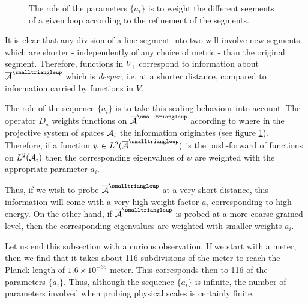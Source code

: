 \documentclass[12pt]{article}
\def\ca{{\cal A}}
\def\ck{{\cal K}}
\begin{document}


\begin{figure} [t]
\begin{center}
 
\caption{The role of the parameters $\{a_i \}$ is to weight the different segments of a given loop according to the refinement of the segments.}
\label{Fig...}
\end{center}
\end{figure}
 It is clear that any division of a line segment into two will involve new segments which are shorter - independently of any choice of metric - than the original segment. Therefore, functions in $V_\perp$ correspond to information about $\overline{\ca}^{\smalltriangleup}$ which is {\it deeper}, i.e. at a shorter distance, compared to information carried by functions in $V$.  

The role of the sequence $\{a_i\}$ is to take this scaling behaviour into account. The operator $D_{\smalltriangleup}$ weights functions on $\overline{\ca}^{\smalltriangleup}$ according to where in the projective system of spaces $\ca_{i}$ the information originates (see figure \ref{Fig...}). Therefore, if a function $\psi\in L^2(\overline{\ca}^{\smalltriangleup})$ is the push-forward of functions on $L^2(\ca_{i})$ then the corresponding eigenvalues of $\psi$ are weighted with the appropriate parameter $a_i$.

Thus, if we wish to probe $\overline{\ca}^{\smalltriangleup}$ at a very short distance, this information will come with a very high weight factor $a_i$ corresponding to high energy. On the other hand, if $\overline{\ca}^{\smalltriangleup}$ is probed at a more coarse-grained level, then the corresponding eigenvalues are weighted with smaller weights $a_i$.



Let us end this subsection with a curious observation. If we start with a meter, then we find that it takes about 116 subdivisions of the meter to reach the Planck length of
$
1.6 \times 10^{-35}
$ meter. This corresponds then to 116 of the parameters $\{a_i\}$. Thus, although the sequence $\{a_i\}$ is infinite, the number of parameters involved when probing physical scales is certainly finite.
\end{document}
